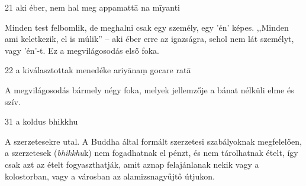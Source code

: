 
\begin{notesdescription}

\item[{21}
{aki éber, nem hal meg}
{appamattā na mīyanti}] \hfill\par

Minden test felbomlik, de meghalni csak egy személy, egy 'én' képes. ,,Minden ami keletkezik, el is múlik'' -- aki éber erre az igazságra, sehol nem lát személyt, vagy 'én'-t. Ez a megvilágosodás első foka.

\item[{22}
{a kiválasztottak menedéke}
{ariyānaṃ gocare ratā}] \hfill\par

A megvilágosodás bármely négy foka, melyek jellemzője a bánat nélküli elme és szív.

\item[{31}
{a koldus}
{bhikkhu}] \hfill\par

A szerzetesekre utal. A Buddha által formált szerzetesi szabályoknak megfelelően, a szerzetesek (\textit{bhikkhu}k) nem fogadhatnak el pénzt, és nem tárolhatnak ételt, így csak azt az ételt fogyaszthatják, amit aznap felajánlanak nekik vagy a kolostorban, vagy a városban az alamizsnagyűjtő útjukon.

\end{notesdescription}

